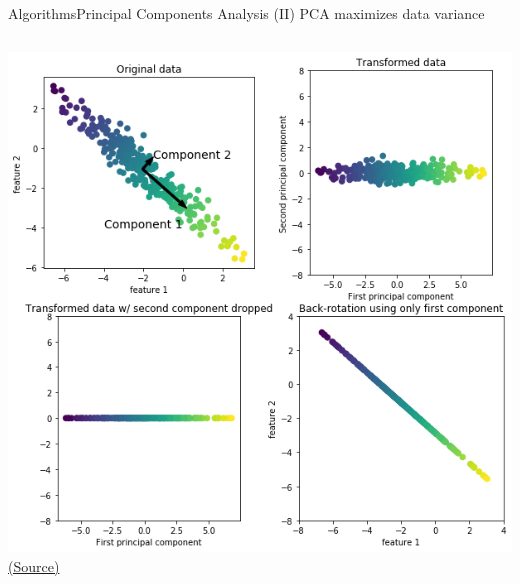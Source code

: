 \documentclass[10pt,compress]{beamer} %
\begin{document}
\begin{frame}{Algorithms}{Principal Components Analysis (II)}
	PCA maximizes data variance

    \begin{columns}
			\includegraphics[width=\linewidth]{figs/pca.png}
    		\centering \tiny{\href{https://github.com/amueller/introduction_to_ml_with_python/blob/master/03-unsupervised-learning.ipynb}{(Source)}}
    \end{columns}
\end{frame}
\end{document}
